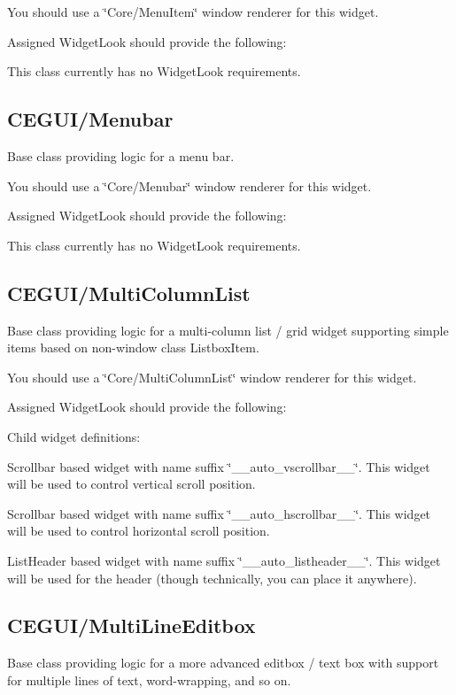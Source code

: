 You should use a \char`\"{}\+Core/\+Menu\+Item\char`\"{} window renderer for this widget.

Assigned Widget\+Look should provide the following\+: 
\begin{DoxyItemize}
\item This class currently has no Widget\+Look requirements. 
\end{DoxyItemize}\hypertarget{fal_baseclass_ref_fal_baseclass_ref_sec_14}{}\subsection{C\+E\+G\+U\+I/\+Menubar}\label{fal_baseclass_ref_fal_baseclass_ref_sec_14}
Base class providing logic for a menu bar.

You should use a \char`\"{}\+Core/\+Menubar\char`\"{} window renderer for this widget.

Assigned Widget\+Look should provide the following\+: 
\begin{DoxyItemize}
\item This class currently has no Widget\+Look requirements. 
\end{DoxyItemize}\hypertarget{fal_baseclass_ref_fal_baseclass_ref_sec_15}{}\subsection{C\+E\+G\+U\+I/\+Multi\+Column\+List}\label{fal_baseclass_ref_fal_baseclass_ref_sec_15}
Base class providing logic for a multi-\/column list / grid widget supporting simple items based on non-\/window class Listbox\+Item.

You should use a \char`\"{}\+Core/\+Multi\+Column\+List\char`\"{} window renderer for this widget.

Assigned Widget\+Look should provide the following\+: 
\begin{DoxyItemize}
\item Child widget definitions\+: 
\begin{DoxyItemize}
\item Scrollbar based widget with name suffix \char`\"{}\+\_\+\+\_\+auto\+\_\+vscrollbar\+\_\+\+\_\+\char`\"{}. This widget will be used to control vertical scroll position. 
\item Scrollbar based widget with name suffix \char`\"{}\+\_\+\+\_\+auto\+\_\+hscrollbar\+\_\+\+\_\+\char`\"{}. This widget will be used to control horizontal scroll position. 
\item List\+Header based widget with name suffix \char`\"{}\+\_\+\+\_\+auto\+\_\+listheader\+\_\+\+\_\+\char`\"{}. This widget will be used for the header (though technically, you can place it anywhere). 
\end{DoxyItemize}
\end{DoxyItemize}\hypertarget{fal_baseclass_ref_fal_baseclass_ref_sec_16}{}\subsection{C\+E\+G\+U\+I/\+Multi\+Line\+Editbox}\label{fal_baseclass_ref_fal_baseclass_ref_sec_16}
Base class providing logic for a more advanced editbox / text box with support for multiple lines of text, word-\/wrapping, and so on.

